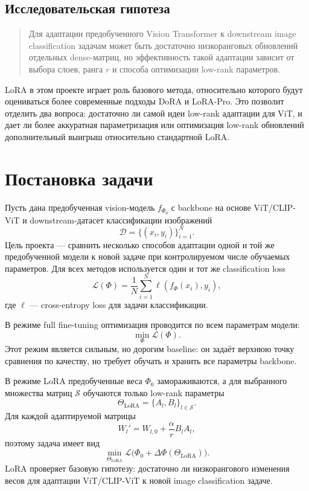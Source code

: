 \documentclass[]{scrartcl}
\begin{document}
\subsection{Исследовательская гипотеза}

\begin{quote}
Для адаптации предобученного Vision Transformer к downstream image classification
задачам может быть достаточно низкоранговых обновлений отдельных dense-матриц,
но эффективность такой адаптации зависит от выбора слоев, ранга $r$ и способа
оптимизации low-rank параметров.
\end{quote}

LoRA в этом проекте играет роль базового метода, относительно которого будут
оцениваться более современные подходы DoRA и LoRA-Pro. Это позволит отделить
два вопроса: достаточно ли самой идеи low-rank адаптации для ViT, и дает ли более
аккуратная параметризация или оптимизация low-rank обновлений дополнительный
выигрыш относительно стандартной LoRA.

\section{Постановка задачи}

Пусть дана предобученная vision-модель $f_{\Phi_0}$ с backbone на основе ViT/CLIP-ViT и downstream-датасет классификации изображений
\[
    \mathcal{D}=\{(x_i,y_i)\}_{i=1}^{N}.
\]
Цель проекта --- сравнить несколько способов адаптации одной и той же предобученной модели к новой задаче при контролируемом числе обучаемых параметров. Для всех методов используется один и тот же classification loss
\[
    \mathcal{L}(\Phi)
    =
    \frac{1}{N}
    \sum_{i=1}^{N}
    \ell(f_{\Phi}(x_i),y_i),
\]
где $\ell$ --- cross-entropy loss для задачи классификации.

В режиме full fine-tuning оптимизация проводится по всем параметрам модели:
\[
    \min_{\Phi}\mathcal{L}(\Phi).
\]
Этот режим является сильным, но дорогим baseline: он задаёт верхнюю точку сравнения по качеству, но требует обучать и хранить все параметры backbone.

В режиме LoRA предобученные веса $\Phi_0$ замораживаются, а для выбранного множества матриц $\mathcal{S}$ обучаются только low-rank параметры
\[
    \Theta_{\mathrm{LoRA}}=\{A_l,B_l\}_{l\in\mathcal{S}}.
\]
Для каждой адаптируемой матрицы
\[
    W_l'
    =
    W_{l,0}+\frac{\alpha}{r}B_lA_l,
\]
поэтому задача имеет вид
\[
    \min_{\Theta_{\mathrm{LoRA}}}
    \mathcal{L}\bigl(\Phi_0+\Delta\Phi(\Theta_{\mathrm{LoRA}})\bigr).
\]
LoRA проверяет базовую гипотезу: достаточно ли низкорангового изменения весов для адаптации ViT/CLIP-ViT к новой image classification задаче.
\end{document}
